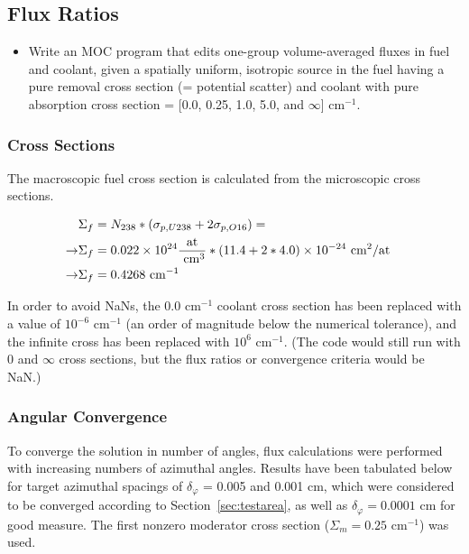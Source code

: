 \documentclass[12pt]{article}
\begin{document}
\newpage
\subsection{Flux Ratios}\label{sec:fluxratios}

\begin{itemize}
\item Write an MOC program that edits one-group volume-averaged fluxes in fuel and coolant, given a spatially uniform, isotropic source in the fuel having a pure removal cross section (= potential scatter) and coolant with pure absorption cross section = [0.0, 0.25, 1.0, 5.0, and $\infty$] cm$^{-1}$.
\end{itemize}

\subsubsection{Cross Sections}\label{sec:crosssections}

The macroscopic fuel cross section is calculated from the microscopic cross sections.

\begin{align}\label{eq:macrofuel}
& \Sigma_f = N_{238} * \left( \sigma_{p,U238} + 2 \sigma_{p,O16} \right) =
\cr \rightarrow
& \Sigma_f = 0.022 \times 10^{24} \frac{\text{at}}{\text{ cm}^3} * 
\left( 11.4 + 2*4.0  \right) \times 10^{-24} \text{ cm}^2/\text{at}
\cr \rightarrow
& \Sigma_f = 0.4268 \text{ cm}^{-1}
\end{align}

In order to avoid NaNs, the 0.0 cm$^{-1}$ coolant cross section has been replaced with a value of $10^{-6} \text{ cm}^{-1}$ (an order of magnitude below the numerical tolerance), and the infinite cross has been replaced with $10^{6} \text{ cm}^{-1}$. (The code would still run with 0 and $\infty$ cross sections, but the flux ratios or convergence criteria would be NaN.)

\subsubsection{Angular Convergence}\label{sec:angularconvergence}

To converge the solution in number of angles, flux calculations were performed with increasing numbers of azimuthal angles. Results have been tabulated below for target azimuthal spacings of $\delta_\varphi$ = 0.005 and 0.001 cm, which were considered to be converged according to Section~\ref{sec:testarea}, as well as $\delta_\varphi = 0.0001$ cm for good measure. The first nonzero moderator cross section ($\Sigma_m = 0.25\text{ cm}^{-1}$) was used.
\end{document}
